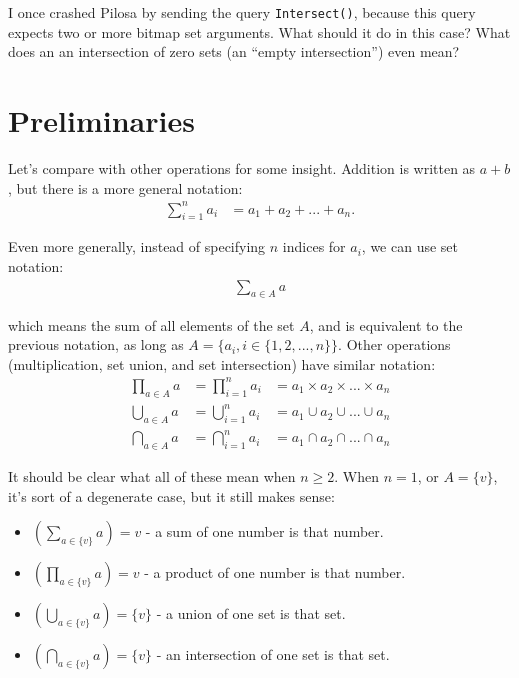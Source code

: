 \documentclass{article}
\begin{document}
I once crashed Pilosa by sending the query \texttt{Intersect()}, because this query expects two or more bitmap set arguments. What should it do in this case? What does an an intersection of zero sets (an ``empty intersection'') even mean?

\section{Preliminaries}

Let's compare with other operations for some insight. Addition is written as $a+b$, but there is a more general notation: 
\begin{align}
\sum\limits_{i=1}^{n}a_i &= a_1 + a_2 + ... + a_n.
\end{align}

Even more generally, instead of specifying $n$ indices for $a_i$, we can use set notation:
\begin{align}
\sum\limits_{a \in A}^{}a
\end{align}

which means the sum of all elements of the set $A$, and is equivalent to the previous notation, as long as $A = \{a_i, i \in \{1, 2, ..., n\}\}$. Other operations (multiplication, set union, and set intersection) have similar notation:
\begin{align}
\prod\limits_{a \in A}^{}a &= \prod\limits_{i=1}^{n}a_i &= a_1 \times a_2 \times ... \times a_n\\
\bigcup\limits_{a \in A}^{}a &= \bigcup\limits_{i=1}^{n}a_i &= a_1 \cup a_2 \cup ... \cup a_n\\
\bigcap\limits_{a \in A}^{}a &= \bigcap\limits_{i=1}^{n}a_i &= a_1 \cap a_2 \cap ... \cap a_n
\end{align}

It should be clear what all of these mean when $n \ge 2$. When $n=1$, or $A=\{v\}$, 
it's sort of a degenerate case, but it still makes sense: 
\begin{itemize}
\item $\left(\sum\limits_{a\in \{v\}}a\right) = v$ - a sum of one number is that number.\\
\item $\left(\prod\limits_{a\in \{v\}}a\right) = v$ - a product of one number is that number.\\
\item $\left(\bigcup\limits_{a\in \{v\}}a\right) = \{v\}$ - a union of one set is that set.\\
\item $\left(\bigcap\limits_{a\in \{v\}}a\right) = \{v\}$ - an intersection of one set is that set.\\
\end{itemize}
\end{document}
